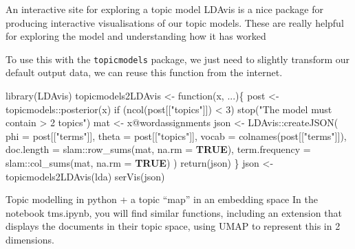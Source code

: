 \documentclass[
  10pt,
  ignorenonframetext,
  aspectratio=169]{beamer}
\newenvironment{Shaded}{\begin{snugshade}}{\end{snugshade}}
\newcommand{\AttributeTok}[1]{\textcolor[rgb]{0.80,0.80,0.80}{#1}}
\newcommand{\ConstantTok}[1]{\textcolor[rgb]{0.86,0.64,0.64}{\textbf{#1}}}
\newcommand{\ControlFlowTok}[1]{\textcolor[rgb]{0.94,0.87,0.69}{#1}}
\newcommand{\DecValTok}[1]{\textcolor[rgb]{0.86,0.86,0.80}{#1}}
\newcommand{\FunctionTok}[1]{\textcolor[rgb]{0.94,0.94,0.56}{#1}}
\newcommand{\NormalTok}[1]{\textcolor[rgb]{0.80,0.80,0.80}{#1}}
\newcommand{\OtherTok}[1]{\textcolor[rgb]{0.94,0.94,0.56}{#1}}
\newcommand{\SpecialCharTok}[1]{\textcolor[rgb]{0.86,0.64,0.64}{#1}}
\newcommand{\StringTok}[1]{\textcolor[rgb]{0.80,0.58,0.58}{#1}}
\begin{document}
\begin{frame}[fragile]{An interactive site for exploring a topic model}
\protect\hypertarget{an-interactive-site-for-exploring-a-topic-model}{}
LDAvis is a nice package for producing interactive visualisations of our
topic models. These are really helpful for exploring the model and
understanding how it has worked

To use this with the \texttt{topicmodels} package, we just need to
slightly transform our default output data, we can reuse this function
from the internet.

\medskip
\scriptsize

\begin{Shaded}
\begin{Highlighting}[]
\FunctionTok{library}\NormalTok{(LDAvis)}
\NormalTok{topicmodels2LDAvis }\OtherTok{\textless{}{-}} \ControlFlowTok{function}\NormalTok{(x, ...)\{}
\NormalTok{  post }\OtherTok{\textless{}{-}}\NormalTok{ topicmodels}\SpecialCharTok{::}\FunctionTok{posterior}\NormalTok{(x)}
  \ControlFlowTok{if}\NormalTok{ (}\FunctionTok{ncol}\NormalTok{(post[[}\StringTok{"topics"}\NormalTok{]]) }\SpecialCharTok{\textless{}} \DecValTok{3}\NormalTok{) }\FunctionTok{stop}\NormalTok{(}\StringTok{"The model must contain \textgreater{} 2 topics"}\NormalTok{)}
\NormalTok{  mat }\OtherTok{\textless{}{-}}\NormalTok{ x}\SpecialCharTok{@}\NormalTok{wordassignments}
\NormalTok{  json }\OtherTok{\textless{}{-}}\NormalTok{ LDAvis}\SpecialCharTok{::}\FunctionTok{createJSON}\NormalTok{(}
    \AttributeTok{phi =}\NormalTok{ post[[}\StringTok{"terms"}\NormalTok{]], }
    \AttributeTok{theta =}\NormalTok{ post[[}\StringTok{"topics"}\NormalTok{]],}
    \AttributeTok{vocab =} \FunctionTok{colnames}\NormalTok{(post[[}\StringTok{"terms"}\NormalTok{]]),}
    \AttributeTok{doc.length =}\NormalTok{ slam}\SpecialCharTok{::}\FunctionTok{row\_sums}\NormalTok{(mat, }\AttributeTok{na.rm =} \ConstantTok{TRUE}\NormalTok{),}
    \AttributeTok{term.frequency =}\NormalTok{ slam}\SpecialCharTok{::}\FunctionTok{col\_sums}\NormalTok{(mat, }\AttributeTok{na.rm =} \ConstantTok{TRUE}\NormalTok{)}
\NormalTok{  )}
  \FunctionTok{return}\NormalTok{(json)}
\NormalTok{\}}
\NormalTok{json }\OtherTok{\textless{}{-}} \FunctionTok{topicmodels2LDAvis}\NormalTok{(lda)}
\FunctionTok{serVis}\NormalTok{(json)}
\end{Highlighting}
\end{Shaded}
\end{frame}

\begin{frame}{Topic modelling in python + a topic ``map'' in an
embedding space}
\protect\hypertarget{topic-modelling-in-python-a-topic-map-in-an-embedding-space}{}
In the notebook tms.ipynb, you will find similar functions, including an
extension that displays the documents in their topic space, using UMAP
to represent this in 2 dimensions.
\end{frame}
\end{document}
